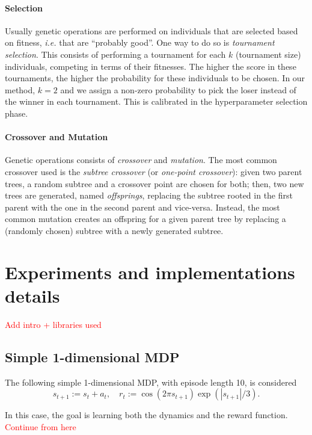 \documentclass[11pt]{article}
\begin{document}
\paragraph{Selection} Usually genetic operations are performed on individuals that are selected based on fitness, \textsl{i.e.} that are ``probably good''. One way to do so is \textsl{tournament selection}. This consists of performing a tournament for each $k$ (tournament size) individuals, competing in terms of their fitnesses. The higher the score in these tournaments, the higher the probability for these individuals to be chosen. In our method, $k=2$ and we assign a non-zero probability to pick the loser instead of the winner in each tournament. This is calibrated in the hyperparameter selection phase. 

\paragraph{Crossover and Mutation} Genetic operations consists of \textsl{crossover} and \textsl{mutation}. The most common crossover used is the \textsl{subtree crossover} (or \textsl{one-point crossover}): given two parent trees, a random subtree and a crossover point are chosen for both; then, two new trees are generated, named \textsl{offsprings}, replacing the subtree rooted in the first parent with the one in the second parent and vice-versa.
Instead, the most common mutation creates an offspring for a given parent tree by replacing a (randomly chosen) subtree with a newly generated subtree. 


\section{Experiments and implementations details}
\textcolor{red}{Add intro + libraries used}


\subsection{Simple 1-dimensional MDP}
The following simple 1-dimensional MDP, with episode length 10, is considered
\begin{equation}
	s_{t+1} := s_t + a_t, \quad 	r_t := \cos(2\pi s_{t+1})\exp(|s_{t+1}|/3).
\end{equation}

In this case, the goal is learning both the dynamics and the reward function. \textcolor{red}{Continue from here}
\end{document}
